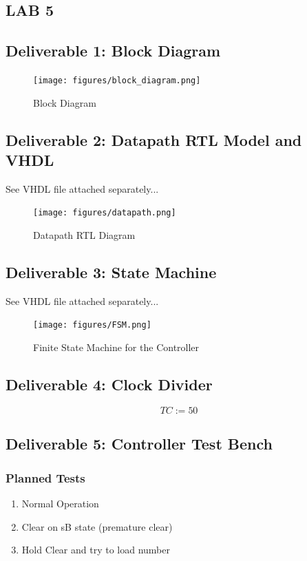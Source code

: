 \documentclass[10pt]{article}
\begin{document}

\begin{centering}
  \section*{LAB 5}
\end{centering}

\subsection*{Deliverable 1: Block Diagram}

\begin{figure} [H]
  \center
  \texttt{[image: figures/block\_diagram.png]}
  \caption{Block Diagram}
\end{figure}

\subsection*{Deliverable 2: Datapath RTL Model and VHDL}

See VHDL file attached separately...

\begin{figure} [H]
  \center
  \texttt{[image: figures/datapath.png]}
  \caption{Datapath RTL Diagram}
\end{figure}

\subsection*{Deliverable 3: State Machine}

See VHDL file attached separately...

\begin{figure} [H]
  \center
  \texttt{[image: figures/FSM.png]}
  \caption{Finite State Machine for the Controller}
\end{figure}

\subsection*{Deliverable 4: Clock Divider}
\[
  TC := 50
\]

\subsection*{Deliverable 5: Controller Test Bench}

\subsubsection{Planned Tests}
\begin{enumerate}
  \item Normal Operation
  \item Clear on sB state (premature clear)
  \item Hold Clear and try to load number
\end{enumerate}
\end{document}
